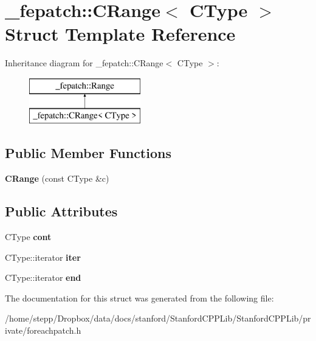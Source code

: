 \hypertarget{struct__fepatch_1_1CRange}{}\section{\+\_\+fepatch\+:\+:C\+Range$<$ C\+Type $>$ Struct Template Reference}
\label{struct__fepatch_1_1CRange}
Inheritance diagram for \+\_\+fepatch\+:\+:C\+Range$<$ C\+Type $>$\+:\begin{figure}[H]
\begin{center}
\leavevmode
\includegraphics[height=2.000000cm]{struct__fepatch_1_1CRange}
\end{center}
\end{figure}
\subsection*{Public Member Functions}
\begin{DoxyCompactItemize}
\item 
\mbox{\label{struct__fepatch_1_1CRange_a9a5244805e99e4486e13b6eba12e9c89}} 
{\bfseries C\+Range} (const C\+Type \&c)
\end{DoxyCompactItemize}
\subsection*{Public Attributes}
\begin{DoxyCompactItemize}
\item 
\mbox{\label{struct__fepatch_1_1CRange_a74c999df44fdb60a134473f89ccc73ba}} 
C\+Type {\bfseries cont}
\item 
\mbox{\label{struct__fepatch_1_1CRange_a2dba166aa7d4a688d03cb01c5d0d912f}} 
C\+Type\+::iterator {\bfseries iter}
\item 
\mbox{\label{struct__fepatch_1_1CRange_a2f26b55aa2e437e742c0f19a3bb0e3f3}} 
C\+Type\+::iterator {\bfseries end}
\end{DoxyCompactItemize}


The documentation for this struct was generated from the following file\+:\begin{DoxyCompactItemize}
\item 
/home/stepp/\+Dropbox/data/docs/stanford/\+Stanford\+C\+P\+P\+Lib/\+Stanford\+C\+P\+P\+Lib/private/foreachpatch.\+h\end{DoxyCompactItemize}
